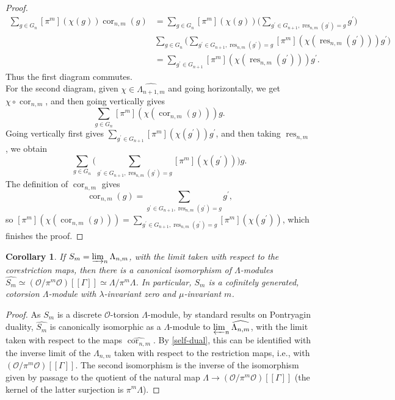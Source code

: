 \documentclass[12 pt]{amsart}
\theoremstyle{plain}
\newtheorem{cor}[thm]{Corollary}
\theoremstyle{definition}
\numberwithin{equation}{section}
\numberwithin{table}{section}
\begin{document}
\begin{proof}
\begin{align*}
\sum_{g\in G_n}[\pi^m](\chi(g))\operatorname{cor}_{n,m}(g)&=
\sum_{g\in G_n}[\pi^m](\chi(g))\Bigg(\sum_{g^\prime\in G_{n+1},\operatorname{res}_{n,m}(g^\prime)=g}g^\prime\Bigg)\\
&\sum_{g\in G_n}\Bigg(\sum_{g^\prime\in G_{n+1},\operatorname{res}_{n,m}(g^\prime)=g}[\pi^m](\chi(\operatorname{res}_{n,m}(g^\prime)))g^\prime\Bigg)\\
&=\sum_{g^\prime\in G_{n+1}}[\pi^m](\chi(\operatorname{res}_{n,m}(g^\prime))) g^\prime\text{.}
\end{align*}
Thus the first diagram commutes.\\
\indent For the second diagram, given $\chi\in\widehat{\Lambda_{n+1,m}}$ and going horizontally, we get $\chi\circ\operatorname{cor}_{n,m}$, and then going vertically gives
\begin{equation*}
\sum_{g\in G_n}[\pi^m](\chi(\operatorname{cor}_{n,m}(g)))g\text{.}
\end{equation*}
Going vertically first gives $\sum_{g^\prime\in G_{n+1}}[\pi^m](\chi(g^\prime))g^\prime$, and then taking $\operatorname{res}_{n,m}$, we obtain
\begin{equation*}
\sum_{g\in G_n}\Bigg(\sum_{g^\prime\in G_{n+1},\operatorname{res}_{n,m}(g^\prime)=g}[\pi^m](\chi(g^\prime))\Bigg) g\text{.}
\end{equation*}
The definition of $\operatorname{cor}_{n,m}$ gives
\begin{equation*}
\operatorname{cor}_{n,m}(g)=\sum_{g^\prime\in G_{n+1},\operatorname{res}_{n,m}(g^\prime)=g}g^\prime\text{,}
\end{equation*}
so $[\pi^m](\chi(\operatorname{cor}_{n,m}(g)))=\sum_{g^\prime\in G_{n+1},\operatorname{res}_{n,m}(g^\prime)=g}[\pi^m](\chi(g^\prime))$, which finishes the proof.
\end{proof}
\begin{cor}
\label{discrete-lim}
If $S_m=\varinjlim_n\Lambda_{n,m}$, with the limit taken with respect to the corestriction maps, then there is a canonical isomorphism of $\Lambda$-modules $\widehat{S_m}\simeq(\mathscr{O}/\pi^m\mathscr{O})[[\Gamma]]\simeq\Lambda/\pi^m\Lambda$. In particular, $S_m$ is a cofinitely generated, cotorsion $\Lambda$-module with $\lambda$-invariant zero and $\mu$-invariant $m$.
\end{cor}
\begin{proof}
As $S_m$ is a discrete $\mathscr{O}$-torsion $\Lambda$-module, by standard results on Pontryagin duality, $\widehat{S_m}$ is canonically isomorphic as a $\Lambda$-module to $\varprojlim_n\widehat{\Lambda_{n,m}}$, with the limit taken with respect to the maps $\widehat{\operatorname{cor}_{n,m}}$. By \cref{self-dual}, this can be identified with the inverse limit of the $\Lambda_{n,m}$ taken with respect to the restriction maps, i.e., with $(\mathscr{O}/\pi^m\mathscr{O})[[\Gamma]]$. The second isomorphism is the inverse of the isomorphism given by passage to the quotient of the natural map $\Lambda\rightarrow(\mathscr{O}/\pi^m\mathscr{O})[[\Gamma]]$ (the kernel of the latter surjection is $\pi^m\Lambda$).
\end{proof}
\end{document}
